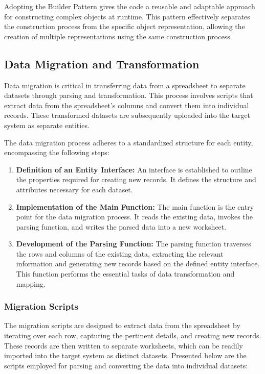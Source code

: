 \documentclass[12pt]{article}
\begin{document}
Adopting the Builder Pattern gives the code a reusable and adaptable approach for constructing complex objects at runtime. This pattern effectively separates the construction process from the specific object representation, allowing the creation of multiple representations using the same construction process.

\subsection{Data Migration and Transformation}
Data migration is critical in transferring data from a spreadsheet to separate datasets through parsing and transformation. This process involves scripts that extract data from the spreadsheet's columns and convert them into individual records. These transformed datasets are subsequently uploaded into the target system as separate entities.

The data migration process adheres to a standardized structure for each entity, encompassing the following steps:

\begin{enumerate}[label=(\roman*)]
    \item \textbf{Definition of an Entity Interface:} An interface is established to outline the properties required for creating new records. It defines the structure and attributes necessary for each dataset.
    \item \textbf{Implementation of the Main Function:} The main function is the entry point for the data migration process. It reads the existing data, invokes the parsing function, and writes the parsed data into a new worksheet.
    \item \textbf{Development of the Parsing Function:} The parsing function traverses the rows and columns of the existing data, extracting the relevant information and generating new records based on the defined entity interface. This function performs the essential tasks of data transformation and mapping.
\end{enumerate}

\subsubsection{Migration Scripts}
The migration scripts are designed to extract data from the spreadsheet by iterating over each row, capturing the pertinent details, and creating new records. These records are then written to separate worksheets, which can be readily imported into the target system as distinct datasets. Presented below are the scripts employed for parsing and converting the data into individual datasets:
\end{document}
